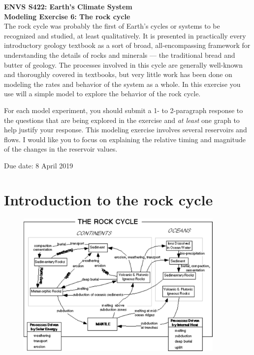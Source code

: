 \documentclass[11pt,letterpaper]{article}
\begin{document}
\setlength{\parindent}{0in}
\newcommand{\tablespace}[0]{\vspace{8pt}}
\textbf{ENVS S422: Earth's Climate System\\
Modeling Exercise 6: The rock cycle}\\%

The rock cycle was probably the first of Earth's cycles or systems to be recognized and studied, at least qualitatively. It is presented in practically every introductory geology textbook as a sort of broad, all-encompassing framework for understanding the details of rocks and minerals --- the traditional bread and butter of geology. The processes involved in this cycle are generally well-known and thoroughly covered in textbooks, but very little work has been done on modeling the rates and behavior of the system as a whole. In this exercise you use will a simple model to explore the behavior of the rock cycle.

For each model experiment, you should submit a 1- to 2-paragraph response to the questions that are being explored in the exercise and \textit{at least} one graph to help justify your response. This modeling exercise involves several reservoirs and flows. I would like you to focus on explaining the relative timing and magnitude of the changes in the reservoir values.

Due date: 8 April 2019

\section{Introduction to the rock cycle}
\begin{figure}[h]
\center\includegraphics[width=4in]{./rock_cycle}
\end{figure}
\end{document}
